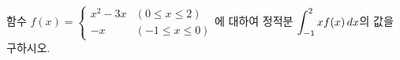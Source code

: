 함수 $f(x)=\begin{cases} x^2-3x & (0\le x\le 2) \\ -x & (-1\le x\le 0) \end{cases}$에 대하여 정적분 $\displaystyle\int_{-1}^{2} xf(x)\mkern3mu dx$의 값을 구하시오.
